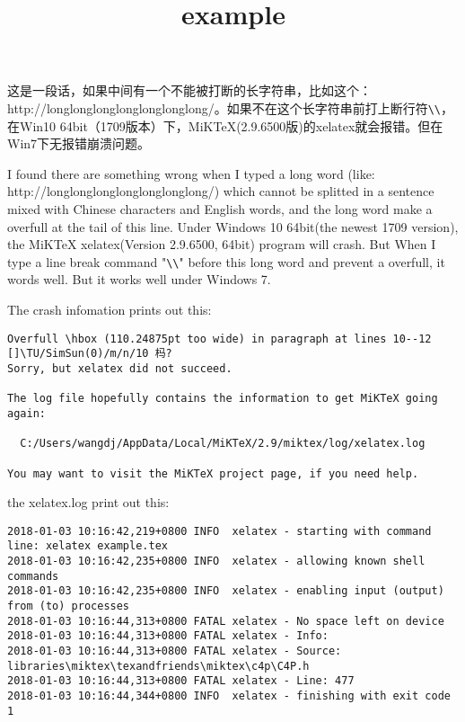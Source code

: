 \documentclass{article}
\begin{document}
\title{example}

\maketitle

这是一段话，如果中间有一个不能被打断的长字符串，比如这个：\\
http://longlonglonglonglonglonglong/。如果不在这个长字符串前打上断行符\verb+\\+，在Win10 64bit（1709版本）下，MiKTeX(2.9.6500版)的xelatex就会报错。但在Win7下无报错崩溃问题。

I found there are something wrong when I typed a long word (like: http://longlonglonglonglonglonglong/) which cannot be splitted in a sentence mixed with Chinese characters and English words, and the long word make a overfull at the tail of this line. Under Windows 10 64bit(the newest 1709 version), the MiKTeX xelatex(Version 2.9.6500, 64bit) program will crash. But When I type a line break command "\verb+\\+" before this long word and prevent a overfull, it words well. But it works well under Windows 7.

The crash infomation prints out this:

\begin{verbatim}
Overfull \hbox (110.24875pt too wide) in paragraph at lines 10--12
[]\TU/SimSun(0)/m/n/10 杩?
Sorry, but xelatex did not succeed.

The log file hopefully contains the information to get MiKTeX going again:

  C:/Users/wangdj/AppData/Local/MiKTeX/2.9/miktex/log/xelatex.log

You may want to visit the MiKTeX project page, if you need help.
\end{verbatim}

the xelatex.log print out this:

\begin{verbatim}
2018-01-03 10:16:42,219+0800 INFO  xelatex - starting with command line: xelatex example.tex
2018-01-03 10:16:42,235+0800 INFO  xelatex - allowing known shell commands
2018-01-03 10:16:42,235+0800 INFO  xelatex - enabling input (output) from (to) processes
2018-01-03 10:16:44,313+0800 FATAL xelatex - No space left on device
2018-01-03 10:16:44,313+0800 FATAL xelatex - Info: 
2018-01-03 10:16:44,313+0800 FATAL xelatex - Source: libraries\miktex\texandfriends\miktex\c4p\C4P.h
2018-01-03 10:16:44,313+0800 FATAL xelatex - Line: 477
2018-01-03 10:16:44,344+0800 INFO  xelatex - finishing with exit code 1
\end{verbatim}
\end{document}
